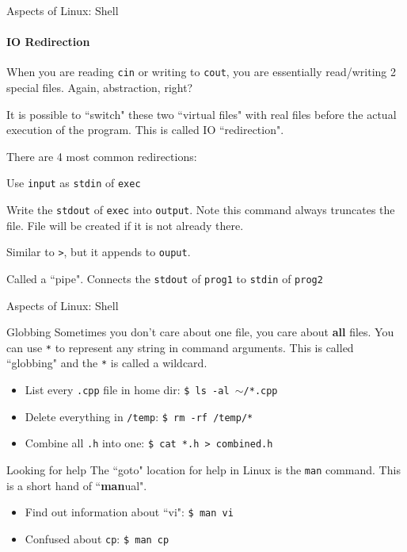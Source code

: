 \begin{frame}{Aspects of Linux: Shell}
\framesubtitle{IO Redirection}
When you are reading \texttt{cin} or writing to \texttt{cout}, you are essentially read/writing 2 special files. Again, abstraction, right? 

It is possible to ``switch" these two ``virtual files" with real files before the actual execution of the program. This is called IO ``redirection".

There are 4 most common redirections:

\begin{description}
	\item[\texttt{exec < input}] Use \texttt{input} as \texttt{stdin} of \texttt{exec}
	\item[\texttt{exec > output}] Write the \texttt{stdout} of \texttt{exec}  into \texttt{output}. Note this command always truncates the file. File will be created if it is not already there.
	\item[\texttt{exec >> output}] Similar to \texttt{>}, but it appends to \texttt{ouput}.
	\item[\texttt{prog1 | prog2}] Called a ``pipe". Connects the \texttt{stdout} of \texttt{prog1} to \texttt{stdin} of \texttt{prog2}
\end{description}
\end{frame}

\begin{frame}{Aspects of Linux: Shell}
\begin{block}{Globbing}
	Sometimes you don't care about one file, you care about \textbf{all} files. You can use \texttt{*} to represent any string in command arguments. This is called ``globbing" and the \texttt{*} is called a wildcard.
	
	\begin{itemize}
	\item List every \texttt{.cpp} file in home dir: \texttt{\$ ls -al $\sim$/*.cpp}
	\item Delete everything in \texttt{/temp}: \texttt{\$ rm -rf /temp/*}
	\item Combine all \texttt{.h} into one: \texttt{\$ cat *.h > combined.h}
	\end{itemize}
\end{block}

\begin{block}{Looking for help}
	The ``goto" location for help in Linux is the \texttt{man} command. This is a short hand of ``\textbf{man}ual". 
	\begin{itemize}
		\item Find out information about ``vi": \texttt{\$ man vi}
		\item Confused about \texttt{cp}: \texttt{\$ man cp}
	\end{itemize}
\end{block}
\end{frame}

